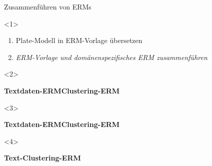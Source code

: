 \documentclass{beamer}
\newcommand{\adjustTikzSize}[0]{\Large}
\newcommand{\tikzScale}[0]{0.55}
\begin{document}
\begin{frame}[t]{Zusammenführen von ERMs}
\begin{onlyenv}<1>
	\begin{center}
	\scalebox{\tikzScale}{\adjustTikzSize }
	\end{center}
	\begin{enumerate}
	\item Plate-Modell in ERM-Vorlage übersetzen
	\item \textcolor{mred}{\emph{ERM-Vorlage und domänenspezifisches ERM zusammenführen}}
	\end{enumerate}
\end{onlyenv}

\begin{onlyenv}<2>
	\vspace*{1.5em}
	\begin{center}
	\scalebox{0.37}{\adjustTikzSize }
	
	\textbf{Textdaten-ERM}\hspace*{8em}\textbf{Clustering-ERM}\hspace*{1em}
	\end{center}
\end{onlyenv}

\begin{onlyenv}<3>
	\vspace*{1.5em}
	\begin{center}
	\scalebox{0.37}{\adjustTikzSize }
	
	\textbf{Textdaten-ERM}\hspace*{8em}\textbf{Clustering-ERM}\hspace*{1em}
	\end{center}
\end{onlyenv}

\begin{onlyenv}<4>
	\vspace*{1.5em}
	\begin{center}
	\scalebox{0.37}{\adjustTikzSize }
	
	\textbf{Text-Clustering-ERM}
	\end{center}
\end{onlyenv}
\end{frame}
\end{document}
